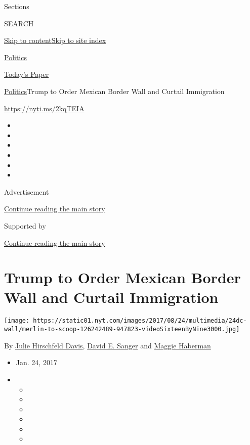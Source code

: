 Sections

SEARCH

\protect\hyperlink{site-content}{Skip to
content}\protect\hyperlink{site-index}{Skip to site index}

\href{https://www.nytimes.com/section/politics}{Politics}

\href{https://myaccount.nytimes.com/auth/login?response_type=cookie\&client_id=vi}{}

\href{https://www.nytimes.com/section/todayspaper}{Today's Paper}

\href{/section/politics}{Politics}\textbar{}Trump to Order Mexican
Border Wall and Curtail Immigration

\url{https://nyti.ms/2kqTEIA}

\begin{itemize}
\item
\item
\item
\item
\item
\item
\end{itemize}

Advertisement

\protect\hyperlink{after-top}{Continue reading the main story}

Supported by

\protect\hyperlink{after-sponsor}{Continue reading the main story}

\hypertarget{trump-to-order-mexican-border-wall-and-curtail-immigration}{%
\section{Trump to Order Mexican Border Wall and Curtail
Immigration}\label{trump-to-order-mexican-border-wall-and-curtail-immigration}}

\texttt{[image: https://static01.nyt.com/images/2017/08/24/multimedia/24dc-wall/merlin-to-scoop-126242489-947823-videoSixteenByNine3000.jpg]}

By \href{https://www.nytimes.com/by/julie-hirschfeld-davis}{Julie
Hirschfeld Davis}, \href{http://www.nytimes.com/by/david-e-sanger}{David
E. Sanger} and \href{http://www.nytimes.com/by/maggie-haberman}{Maggie
Haberman}

\begin{itemize}
\item
  Jan. 24, 2017
\item
  \begin{itemize}
  \item
  \item
  \item
  \item
  \item
  \item
  \end{itemize}
\end{itemize}

